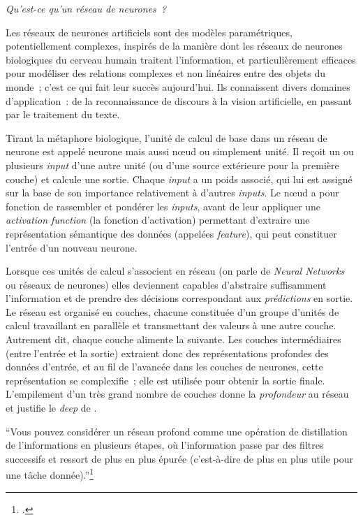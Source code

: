 \emph{Qu'est-ce qu'un réseau de neurones~?}

Les réseaux de neurones artificiels sont des modèles paramétriques,
potentiellement complexes, inspirés de la manière dont les réseaux de
neurones biologiques du cerveau humain traitent l'information, et
particulièrement efficaces pour modéliser des relations complexes et non
linéaires entre des objets du monde~; c'est ce qui fait leur succès
aujourd'hui. Ils connaissent divers domaines d'application~: de la
reconnaissance de discours à la vision artificielle, en passant par le
traitement du texte.

Tirant la métaphore biologique, l'unité de calcul de base dans un réseau
de neurone est appelé neurone mais aussi nœud ou simplement unité. Il
reçoit un ou plusieurs \textit{input} d'une autre unité (ou d'une source
extérieure pour la première couche) et calcule une sortie. Chaque \textit{input}
a un poids associé, qui lui est assigné sur la base de son importance
relativement à d'autres \textit{inputs}. Le nœud a pour fonction de rassembler et
pondérer les \textit{inputs}, avant de leur appliquer une \emph{activation
function} (la fonction d'activation) permettant d'extraire une
représentation sémantique des données (appelées \emph{feature}), qui
peut constituer l'entrée d'un nouveau neurone.

Lorsque ces unités de calcul s'associent en réseau (on parle de
\emph{Neural Networks} ou réseaux de neurones) elles deviennent capables
d'abstraire suffisamment l'information et de prendre des décisions
correspondant aux \emph{prédictions} en sortie. Le réseau est organisé
en couches, chacune constituée d'un groupe d'unités de calcul
travaillant en parallèle et transmettant des valeurs à une autre couche.
Autrement dit, chaque couche alimente la suivante. Les couches
intermédiaires (entre l'entrée et la sortie) extraient donc des
représentations profondes des données d'entrée, et au fil de l'avancée
dans les couches de neurones, cette représentation se complexifie~; elle
est utilisée pour obtenir la sortie finale. L'empilement d'un très grand
nombre de couches donne la \emph{profondeur} au réseau et justifie le
\emph{deep} de \dl.

\begin{kwote}
``Vous pouvez considérer un réseau profond comme une opération de distillation de l'informations en plusieurs étapes, où l'information passe par des filtres successifs et ressort de plus en plus épurée (c'est-à-dire de plus en plus utile pour une tâche donnée).''\footcite[p.12]{chollet_apprentissage_2020}
\end{kwote}

